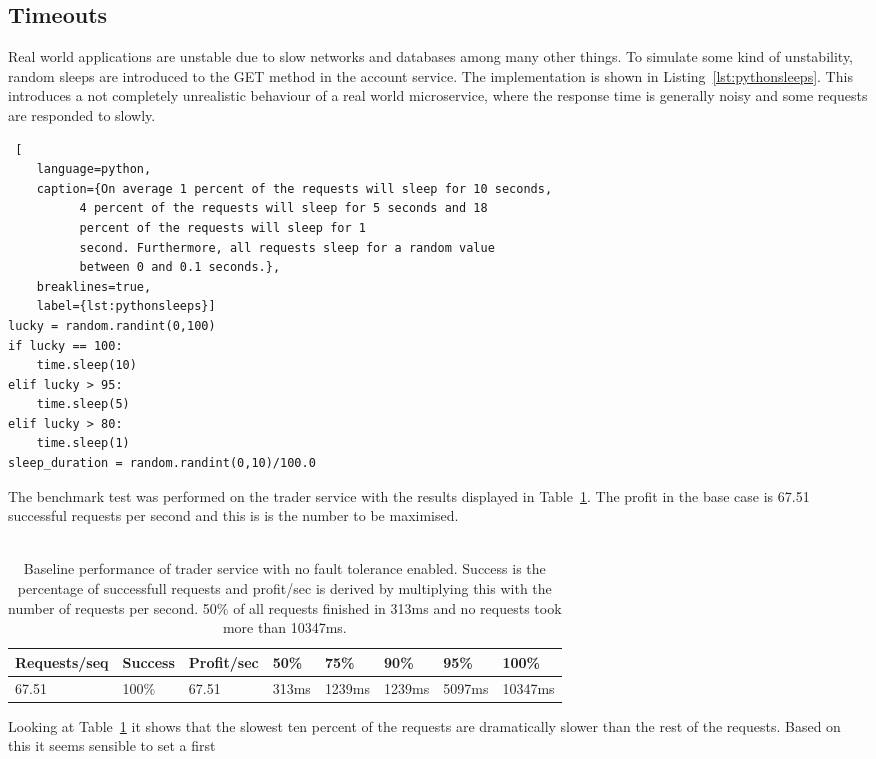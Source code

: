 \subsection{Timeouts}
Real world applications are unstable due to slow networks and
databases among many other things. To simulate some kind of
unstability, random sleeps are introduced to the GET method in the
account service. The implementation is shown in
Listing~\ref{lst:pythonsleeps}. This introduces a not completely
unrealistic behaviour of a real world microservice, where the response
time is generally noisy and some requests are responded to slowly.
\begin{lstlisting} [
	language=python,
	caption={On average 1 percent of the requests will sleep for 10 seconds,
          4 percent of the requests will sleep for 5 seconds and 18
          percent of the requests will sleep for 1
          second. Furthermore, all requests sleep for a random value
          between 0 and 0.1 seconds.},
	breaklines=true,
	label={lst:pythonsleeps}]
lucky = random.randint(0,100) 
if lucky == 100:
    time.sleep(10)
elif lucky > 95:
    time.sleep(5)
elif lucky > 80:
    time.sleep(1)
sleep_duration = random.randint(0,10)/100.0
\end{lstlisting}
The benchmark test was performed on the trader service with the
results displayed in Table~\ref{table:baselinetest}. The profit in the
base case is 67.51 successful requests per second and this is is the
number to be maximised.\\\\
\begin{table}[]
\centering
\caption{Baseline performance of trader service with no fault
  tolerance enabled. Success is the percentage of successfull requests
and profit/sec is derived by multiplying this with the number of
requests per second. 50\% of all requests finished in 313ms and no
requests took more than 10347ms.}
\label{table:baselinetest}
\begin{tabular}{|l|l|l|l|l|l|l|l|}
\hline
Requests/seq & Success & Profit/sec & 50\% & 75\% & 90\% & 95\% & 100\% \\ \hline
67.51 & 100\% & 67.51 & 313ms & 1239ms & 1239ms & 5097ms & 10347ms\\ \hline
\end{tabular}
\end{table}
Looking at Table~\ref{table:baselinetest} it shows that the slowest
ten percent of the requests are dramatically slower than the rest
of the requests. Based on this it seems sensible to set a first
